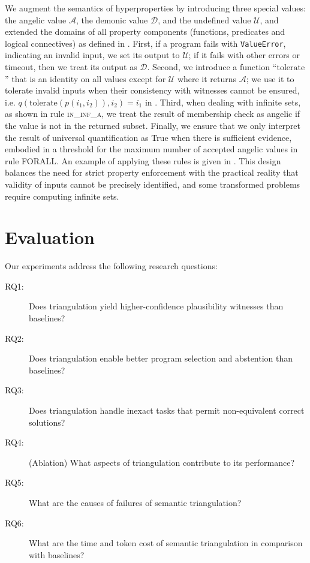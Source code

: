\documentclass[acmsmall,screen,nonacm]{acmart}
\begin{document}
We augment the semantics of hyperproperties by introducing three special values: the angelic value $\mathcal{A}$, the demonic value $\mathcal{D}$, and the undefined value $\mathcal{U}$, and extended the domains of all property components (functions, predicates and logical connectives) as defined in . First, if a program fails with \texttt{ValueError}, indicating an invalid input, we set its output to $\mathcal{U}$; if it fails with other errors or timeout, then we treat its output as $\mathcal{D}$. Second, we introduce a function ``$\mathrm{tolerate}$'' that is an identity on all values except for $\mathcal{U}$ where it returns $\mathcal{A}$; we use it to tolerate invalid inputs when their consistency with witnesses cannot be ensured, i.e. $q(\mathrm{tolerate}(p(i_1, i_2)), i_2) = i_1$ in . Third, when dealing with infinite sets, as shown in rule \textsc{in\_inf\_a}, we treat the result of membership check as angelic if the value is not in the returned subset. Finally, we ensure that we only interpret the result of universal quantification as True when there is sufficient evidence, embodied in a threshold for the maximum number of accepted angelic values in rule \textsc{FORALL}. An example of applying these rules is given in . This design balances the need for strict property enforcement with the practical reality that validity of inputs cannot be precisely identified, and some transformed problems require computing infinite sets.

\section{Evaluation}
\label{sec:evaluation}

Our experiments address the following research questions:
\begin{description}
\item[RQ1:] Does triangulation yield higher-confidence plausibility witnesses than baselines?
\item[RQ2:] Does triangulation enable better program selection and abstention than baselines?
\item[RQ3:] Does triangulation handle inexact tasks that permit non-equivalent correct solutions?
\item[RQ4:] (Ablation) What aspects of triangulation contribute to its performance?
\item[RQ5:] What are the causes of failures of semantic triangulation?
\item[RQ6:] What are the time and token cost of semantic triangulation in comparison with baselines?
\end{description}
\end{document}
